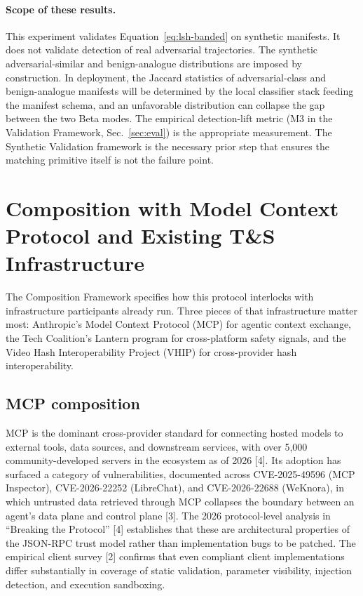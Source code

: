 \documentclass[11pt]{article}
\begin{document}
\paragraph{Scope of these results.}
This experiment validates Equation~\eqref{eq:lsh-banded} on synthetic manifests. It does not validate detection of real adversarial trajectories. The synthetic adversarial-similar and benign-analogue distributions are imposed by construction. In deployment, the Jaccard statistics of adversarial-class and benign-analogue manifests will be determined by the local classifier stack feeding the manifest schema, and an unfavorable distribution can collapse the gap between the two Beta modes. The empirical detection-lift metric (M3 in the Validation Framework, Sec.~\ref{sec:eval}) is the appropriate measurement. The Synthetic Validation framework is the necessary prior step that ensures the matching primitive itself is not the failure point.

\section{Composition with Model Context Protocol and Existing T\&S Infrastructure}
\label{sec:mcp}

The Composition Framework specifies how this protocol interlocks with infrastructure participants already run. Three pieces of that infrastructure matter most: Anthropic's Model Context Protocol (MCP) for agentic context exchange, the Tech Coalition's Lantern program for cross-platform safety signals, and the Video Hash Interoperability Project (VHIP) for cross-provider hash interoperability.

\subsection{MCP composition}

MCP is the dominant cross-provider standard for connecting hosted models to external tools, data sources, and downstream services, with over 5{,}000 community-developed servers in the ecosystem as of 2026 [4]. Its adoption has surfaced a category of vulnerabilities, documented across CVE-2025-49596 (MCP Inspector), CVE-2026-22252 (LibreChat), and CVE-2026-22688 (WeKnora), in which untrusted data retrieved through MCP collapses the boundary between an agent's data plane and control plane [3]. The 2026 protocol-level analysis in ``Breaking the Protocol'' [4] establishes that these are architectural properties of the JSON-RPC trust model rather than implementation bugs to be patched. The empirical client survey [2] confirms that even compliant client implementations differ substantially in coverage of static validation, parameter visibility, injection detection, and execution sandboxing.
\end{document}
